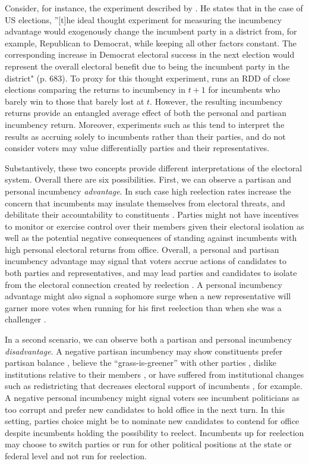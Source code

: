 \documentclass[12pt]{amsart}
\numberwithin{equation}{section}
\theoremstyle{definition}
\theoremstyle{definition}
\theoremstyle{definition}
\begin{document}
Consider, for instance, the experiment described by \citet{lee_2008}. He states that in the case of US elections, ''[t]he ideal thought experiment for measuring the incumbency advantage would exogenously change the incumbent party in a district from, for example, Republican to Democrat, while keeping all other factors constant. The corresponding increase in Democrat electoral success in the next election would represent the overall electoral benefit due to being the incumbent party in the district" (p. 683). To proxy for this thought experiment, \citet{lee_2008} runs an RDD of close elections comparing the returns to incumbency in $t+1$ for incumbents who barely win to those that barely lost at $t$. However, the resulting incumbency returns provide an entangled average effect of both the personal and partisan incumbency return. Moreover, experiments such as this tend to interpret the results as accruing solely to incumbents rather than their parties, and do not consider voters may value differentially parties and their representatives. 

Substantively, these two concepts provide different interpretations of the electoral system. Overall there are six possibilities. First, we can observe a  partisan and personal incumbency \emph{advantage}. In such case high reelection rates increase the concern that incumbents may insulate themselves from electoral threats, and debilitate their accountability to constituents \citep{ashworth_etal_2019, cox_katz_2002}. Parties might not have incentives to monitor or exercise control over their members given their electoral isolation as well as the potential negative consequences of standing against incumbents with high personal electoral returns from office. Overall, a personal and partisan incumbency advantage may signal that voters accrue actions of candidates to both parties and representatives, and may lead parties and candidates to isolate from the electoral connection created by reelection \citep{mayhew_1974}. A personal incumbency advantage might also signal a sophomore surge when a new representative will garner more votes when running for his first reelection than when she was a challenger \citep{erikson_1971, alford_brady_1989}. 

 In a second scenario, we can observe both a partisan and personal incumbency \emph{disadvantage}. A negative partisan incumbency may show constituents prefer partisan balance \citep{folke_snyder_2012}, believe the ``grass-is-greener'' with other parties \citep{bhatia_turan_2013}, dislike institutions relative to their members \citep{parker_davidson_1979}, or have suffered from institutional changes such as redistricting that decreases electoral support of incumbents \citep{ansolabehere_snyder_2000, desposato_petrocik_2003}, for example. A negative personal incumbency might signal voters see incumbent politicians as too corrupt and prefer new candidates to hold office in the next turn. In this setting, parties choice might be to nominate new candidates to contend for office despite incumbents holding the possibility to reelect. Incumbents up for reelection may choose to switch parties or run for other political positions at the state or federal level and not run for reelection. 
  
\end{document}
